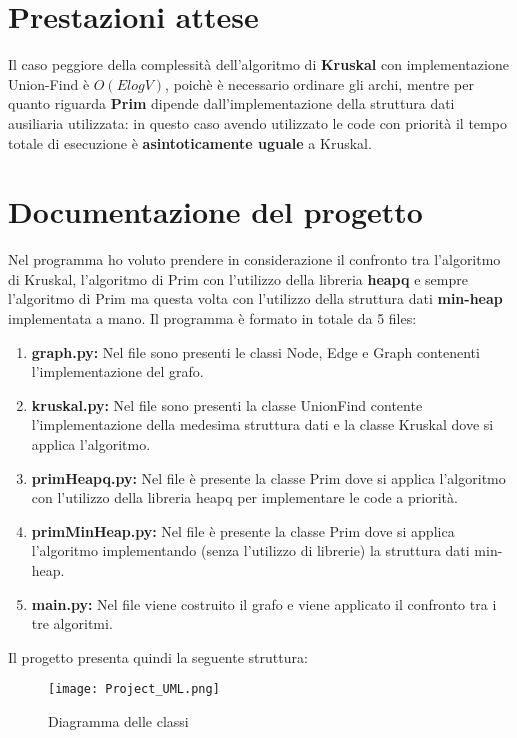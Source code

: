 \documentclass{article}
\begin{document}
\section{Prestazioni attese}
Il caso peggiore della complessità dell'algoritmo di \textbf{Kruskal} con implementazione Union-Find è \textbf{$O(E log V)$}, poichè è necessario ordinare gli archi, mentre per quanto riguarda \textbf{Prim} dipende dall'implementazione della struttura dati ausiliaria utilizzata: in questo caso avendo utilizzato le code con priorità il tempo totale di esecuzione è \textbf{asintoticamente uguale} a Kruskal.

\section{Documentazione del progetto}
Nel programma ho voluto prendere in considerazione il confronto tra l'algoritmo di Kruskal, l'algoritmo di Prim con l'utilizzo della libreria \textbf{heapq} e sempre l'algoritmo di Prim ma questa volta con l'utilizzo della struttura dati \textbf{min-heap} implementata a mano.
Il programma è formato in totale da 5 files:
\begin{enumerate}[label={\roman*.)}, ref={\roman*.)}]
    \item \textbf{graph.py:} Nel file sono presenti le classi Node, Edge e Graph contenenti l'implementazione del grafo.
    \item \textbf{kruskal.py:} Nel file sono presenti la classe UnionFind contente l'implementazione della medesima struttura dati e la classe Kruskal dove si applica l'algoritmo.
    \item \textbf{primHeapq.py:} Nel file è presente la classe Prim dove si applica l'algoritmo con l'utilizzo della libreria heapq per implementare le code a priorità.
    \item \textbf{primMinHeap.py:} Nel file è presente la classe Prim dove si applica l'algoritmo implementando (senza l'utilizzo di librerie) la struttura dati min-heap.
    \item \textbf{main.py:} Nel file viene costruito il grafo e viene applicato il confronto tra i tre algoritmi.
\end{enumerate}

\clearpage

Il progetto presenta quindi la seguente struttura:
\begin{figure}[!hb]
        \centering
        \texttt{[image: Project\_UML.png]}
        \caption{Diagramma delle classi}
        \label{fig:Project_UML}
\end{figure}
\end{document}
